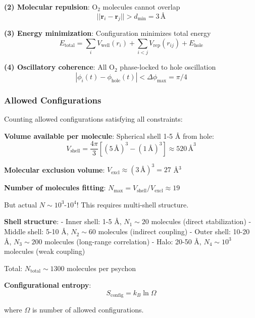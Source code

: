 \documentclass[11pt,onecolumn]{article}
\begin{document}
\textbf{(2) Molecular repulsion}: O$_2$ molecules cannot overlap
\begin{equation}
||\mathbf{r}_i - \mathbf{r}_j|| > d_{\text{min}} = 3\,\text{Å}
\end{equation}

\textbf{(3) Energy minimization}: Configuration minimizes total energy
\begin{equation}
E_{\text{total}} = \sum_i V_{\text{well}}(r_i) + \sum_{i<j} V_{\text{rep}}(r_{ij}) + E_{\text{hole}}
\end{equation}

\textbf{(4) Oscillatory coherence}: All O$_2$ phase-locked to hole oscillation
\begin{equation}
|\phi_i(t) - \phi_{\text{hole}}(t)| < \Delta\phi_{\max} = \pi/4
\end{equation}

\subsubsection{Allowed Configurations}

Counting allowed configurations satisfying all constraints:

\textbf{Volume available per molecule}: Spherical shell 1-5 Å from hole:
\begin{equation}
V_{\text{shell}} = \frac{4\pi}{3}[(5\,\text{Å})^3 - (1\,\text{Å})^3] \approx 520\,\text{Å}^3
\end{equation}

\textbf{Molecular exclusion volume}: $V_{\text{excl}} \approx (3\,\text{Å})^3 = 27$ Å$^3$

\textbf{Number of molecules fitting}: $N_{\max} = V_{\text{shell}} / V_{\text{excl}} \approx 19$

But actual $N \sim 10^3$-$10^4$! This requires multi-shell structure.

\textbf{Shell structure}:
- Inner shell: 1-5 Å, $N_1 \sim 20$ molecules (direct stabilization)
- Middle shell: 5-10 Å, $N_2 \sim 60$ molecules (indirect coupling)
- Outer shell: 10-20 Å, $N_3 \sim 200$ molecules (long-range correlation)
- Halo: 20-50 Å, $N_4 \sim 10^3$ molecules (weak coupling)

Total: $N_{\text{total}} \sim 1300$ molecules per psychon

\textbf{Configurational entropy}:
\begin{equation}
S_{\text{config}} = k_B \ln\Omega
\end{equation}

where $\Omega$ is number of allowed configurations.
\end{document}
